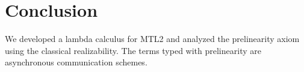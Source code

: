 


\section{Conclusion}
\label{sec:conclude}
We developed a lambda calculus for MTL2 and
analyzed the prelinearity axiom using
the classical realizability.  The terms typed with prelinearity are
asynchronous communication schemes.
